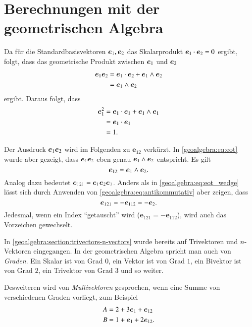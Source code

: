 \newcommand{\eot}{\boldsymbol{e}_{12}}
\section{Berechnungen mit der geometrischen Algebra}
%
Da für die Standardbasisvektoren $\eone, \etwo$ das Skalarprodukt $\eone \cdot \etwo = 0$ ergibt,
folgt, dass das geometrische Produkt zwischen $\eone$ und $\etwo$
\begin{align}
  \eone \etwo &= \eone \cdot \etwo + \eone \wedge \etwo
\notag
\\
  &= \eone \wedge \etwo
  \label{geoalgebra:eq:eot}
\end{align}
ergibt.
Daraus folgt, dass
\begin{align*}
  \eone^2 &= \eone \cdot \eone + \eone \wedge \eone \\
  &= \eone \cdot \eone \\
  &= 1.
\end{align*}

Der Ausdruck $\eone \etwo$ wird im Folgenden zu $\eot$ verkürzt.
In \eqref{geoalgebra:eq:eot} wurde aber gezeigt, dass $\eone \etwo$ eben
genau $\eone \wedge \etwo$ entspricht. Es gilt
\begin{equation}
  \eot = \eone \wedge \etwo.
  \label{geoalgebra:eq:eot_wedge}
\end{equation}
Analog dazu bedeutet $\boldsymbol{e}_{121} = \eone \etwo \eone$.
Anders als in \eqref{geoalgebra:eq:eot_wedge} lässt sich durch Anwenden von \eqref{geoalgebra:eq:antikommutativ}
aber zeigen, dass
\begin{equation*}
  \boldsymbol{e}_{121} = - \boldsymbol{e}_{112} = -\etwo. 
\end{equation*}
Jedesmal, wenn ein Index ``getauscht'' wird ($\boldsymbol{e}_{121} = -\boldsymbol{e}_{112}$), wird auch das Vorzeichen
gewechselt.

In \autoref{geoalgebra:section:trivectors-n-vectors} wurde bereits auf Trivektoren und $n$-Vektoren eingegangen. 
In der geometrischen Algebra
spricht man auch von \emph{Graden}. Ein Skalar ist von
%
Grad $0$, ein Vektor ist von Grad $1$, ein Bivektor ist von Grad $2$, ein Trivektor von Grad $3$ und so weiter.

Desweiteren wird von \emph{Multivektoren} gesprochen, wenn eine Summe von verschiedenen Graden vorliegt, zum Beispiel
\begin{align*}
A &= 2 + 3 \eone + \eot \\
B &= 1 + \eone + 2 \eot.
\end{align*}

